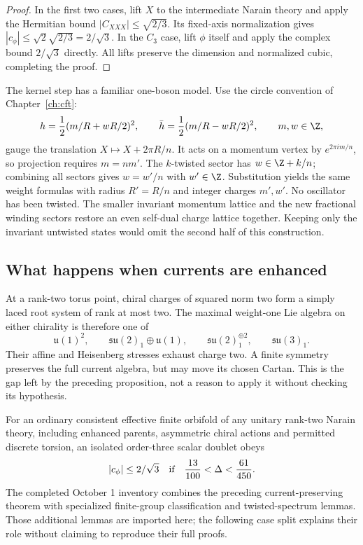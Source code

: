 \begin{proof}
In the first two cases, lift $X$ to the intermediate Narain
theory and apply the Hermitian bound $|C_{XXX}|\leq\sqrt{2/3}$.
Its fixed-axis normalization gives
$|c_\phi|\leq\sqrt2\sqrt{2/3}=2/\sqrt3$.
In the $C_3$ case, lift $\phi$ itself and apply the complex
bound $2/\sqrt3$ directly. All lifts preserve the dimension and
normalized cubic, completing the proof.
\end{proof}

\begin{example}
The kernel step has a familiar one-boson model. Use the circle
convention of Chapter~\ref{ch:cft}:
\[
 h=\frac12(m/R+wR/2)^2,\qquad
 \bar h=\frac12(m/R-wR/2)^2,
 \qquad m,w\in\Z,
\]
gauge the translation $X\mapsto X+2\pi R/n$. It acts on a
momentum vertex by $e^{2\pi im/n}$, so projection requires
$m=nm'$. The $k$-twisted sector has $w\in\Z+k/n$;
combining all sectors gives $w=w'/n$ with $w'\in\Z$.
Substitution yields the same weight formulas with radius
$R'=R/n$ and integer charges $m',w'$. No oscillator has been
twisted. The smaller invariant momentum lattice and the new
fractional winding sectors restore an even self-dual charge
lattice together. Keeping only the invariant untwisted states
would omit the second half of this construction.
\end{example}

\subsection{What happens when currents are enhanced}

At a rank-two torus point, chiral charges of squared norm two form a
simply laced root system of rank at most two. The maximal
weight-one Lie algebra on either chirality is therefore one of
\[
 \mathfrak u(1)^2,\qquad
 \mathfrak{su}(2)_1\oplus\mathfrak u(1),\qquad
 \mathfrak{su}(2)_1^{\oplus2},\qquad
 \mathfrak{su}(3)_1.
\]
Their affine and Heisenberg stresses exhaust charge two. A
finite symmetry preserves the full current algebra, but may
move its chosen Cartan. This is the gap left by the preceding
proposition, not a reason to apply it without checking its
hypothesis.

\begin{constructioninput}
\label{input:Narain-enhanced}
For an ordinary consistent effective finite orbifold of any
unitary rank-two Narain theory, including enhanced parents,
asymmetric chiral actions and permitted discrete torsion, an
isolated order-three scalar doublet obeys
\[
 |c_\phi|\leq2/\sqrt3
 \quad\hbox{if}\quad
 \frac{13}{100}<\Delta<\frac{61}{450}.
\]
The completed October 1 inventory combines the preceding
current-preserving theorem with specialized finite-group
classification and twisted-spectrum lemmas. Those additional
lemmas are imported here; the following case split explains
their role without claiming to reproduce their full proofs.
\end{constructioninput}

